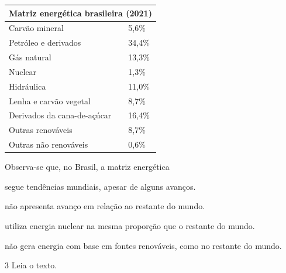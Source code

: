 \begin{center}
\begin{tabular}{ll}
\hline
\multicolumn{2}{l}{\textbf{Matriz energética brasileira (2021)}} \\ \hline
\multicolumn{1}{l|}{Carvão mineral} & 5,6\% \\ \hline
\multicolumn{1}{l|}{Petróleo e derivados} & 34,4\% \\ \hline
\multicolumn{1}{l|}{Gás natural} & 13,3\% \\ \hline
\multicolumn{1}{l|}{Nuclear} & 1,3\% \\ \hline
\multicolumn{1}{l|}{Hidráulica} & 11,0\% \\ \hline
\multicolumn{1}{l|}{Lenha e carvão vegetal} & 8,7\% \\ \hline
\multicolumn{1}{l|}{Derivados da cana-de-açúcar} & 16,4\% \\ \hline
\multicolumn{1}{l|}{Outras renováveis} & 8,7\% \\ \hline
\multicolumn{1}{l|}{Outras não renováveis} & 0,6\% \\ \hline
\end{tabular}
\end{center}

Observa-se que, no Brasil, a matriz energética

\begin{escolha}
\item
  segue tendências mundiais, apesar de alguns avanços.
\item
  não apresenta avanço em relação ao restante do mundo.
\item
  utiliza energia nuclear na mesma proporção que o restante do mundo.
\item
  não gera energia com base em fontes renováveis, como no restante do mundo.
\end{escolha}

\num{3} Leia o texto.

